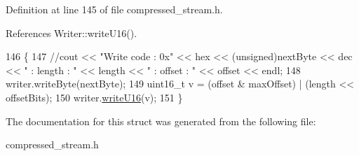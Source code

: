 Definition at line 145 of file compressed\+\_\+stream.\+h.



References Writer\+::write\+U16().


\begin{DoxyCode}
146     \{
147         \textcolor{comment}{//cout << "Write code : 0x" << hex << (unsigned)nextByte << dec << " : length : " << length << " :
       offset : " << offset << endl;}
148         writer.writeByte(nextByte);
149         uint16\_t v = (offset & maxOffset) | (length << offsetBits);
150         writer.\hyperlink{classWriter_a87898dff934c55c144149029173fe66f}{writeU16}(v);
151     \}
\end{DoxyCode}


The documentation for this struct was generated from the following file\+:\begin{DoxyCompactItemize}
\item 
compressed\+\_\+stream.\+h\end{DoxyCompactItemize}

